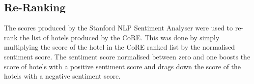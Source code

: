 \subsection{Re-Ranking}

The scores produced by the Stanford NLP Sentiment Analyser were used to re-rank the list of hotels produced by the CoRE. This was done by simply multiplying the score of the hotel in the CoRE ranked list by the normalised sentiment score. The sentiment score normalised between zero and one boosts the score of hotels with a positive sentiment score and drags down the score of the hotels with a negative sentiment score.



